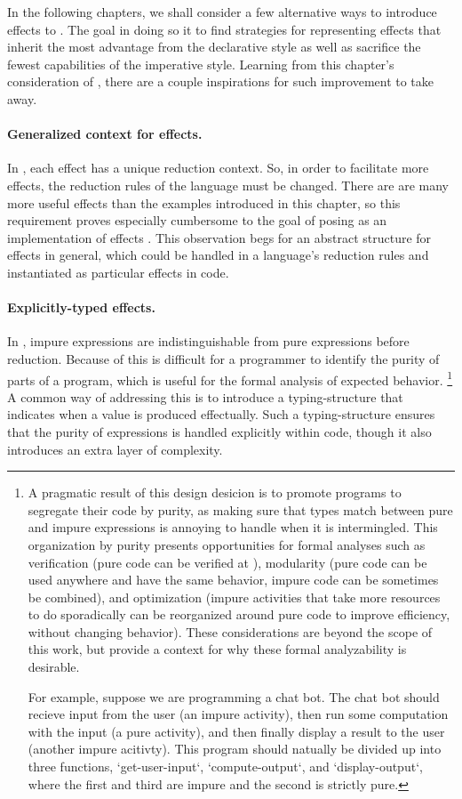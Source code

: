 In the following chapters, we shall consider a few alternative ways to introduce effects to \LangA.
The goal in doing so it to find strategies for representing effects that inherit the most advantage from the declarative style as well as sacrifice the fewest capabilities of the imperative style.
Learning from this chapter's consideration of \LangB, there are a couple inspirations for such improvement to take away.

\paragraph{Generalized context for effects.}
In \LangB, each effect has a unique reduction context.
So, in order to facilitate more effects, the reduction rules of the language must be changed.
There are are many more useful effects than the examples introduced in this chapter, so this requirement proves especially cumbersome to the goal of posing \LangB as an implementation of effects .
This observation begs for an abstract structure for effects in general, which could be handled in a language's reduction rules and instantiated as particular effects in code.

\paragraph{Explicitly-typed effects.}
In \LangB, impure expressions are indistinguishable from pure expressions before reduction.
Because of this is difficult for a programmer to identify the purity of parts of a program, which is useful for the formal analysis of expected behavior.%
\footnote{
  A pragmatic result of this design desicion is to promote programs to segregate their code by purity, as making sure that types match between pure and impure expressions is annoying to handle when it is intermingled.
  This organization by purity presents opportunities for formal analyses such as verification (pure code can be verified at ), modularity (pure code can be used anywhere and have the same behavior, impure code can be sometimes be combined), and optimization (impure activities that take more resources to do sporadically can be reorganized around pure code to improve efficiency, without changing behavior).
  These considerations are beyond the scope of this work, but provide a context for why these formal analyzability is desirable.

  For example, suppose we are programming a chat bot.
  The chat bot should recieve input from the user (an impure activity),
  then run some computation with the input (a pure activity), and
  then finally display a result to the user (another impure acitivty).
  This program should natually be divided up into three functions, \code`get-user-input`, \code`compute-output`, and \code`display-output`, where the first and third are impure and the second is strictly pure.
}
A common way of addressing this is to introduce a typing-structure that indicates when a value is produced effectually.
Such a typing-structure ensures that the purity of expressions is handled explicitly within code, though it also introduces an extra layer of complexity.

